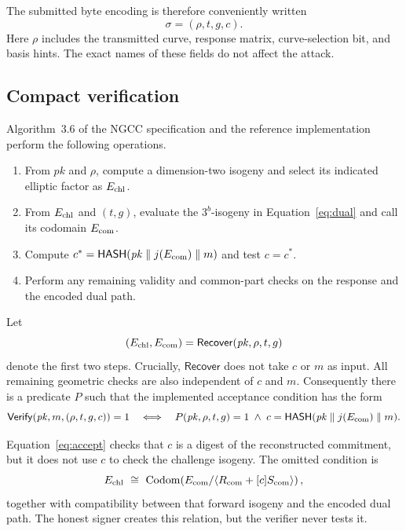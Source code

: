 \documentclass[11pt,a4paper]{article}
\newcommand{\Hash}{\mathsf{HASH}}
\newcommand{\Rec}{\mathsf{Recover}}
\newcommand{\Verify}{\mathsf{Verify}}
\newcommand{\Codom}{\operatorname{Codom}}
\begin{document}
The submitted byte encoding is therefore conveniently written
\begin{equation}
  \sigma=(\rho,t,g,c).                                                \label{eq:sig}
\end{equation}
Here $\rho$ includes the transmitted curve, response matrix, curve-selection bit, and basis
hints.  The exact names of these fields do not affect the attack.

\subsection{Compact verification}

Algorithm~3.6 of the NGCC specification and the reference implementation perform the following operations.
\begin{enumerate}[leftmargin=1.7em]
  \item From $\mathit{pk}$ and $\rho$, compute a dimension-two isogeny and select its indicated
        elliptic factor as $E_{\rm chl}$.
  \item From $E_{\rm chl}$ and $(t,g)$, evaluate the $3^b$-isogeny in
        Equation~\eqref{eq:dual} and call its codomain $E_{\rm com}$.
  \item Compute $c^*=\Hash(\mathit{pk}\parallel j(E_{\rm com})\parallel m)$ and test
        $c=c^*$.
  \item Perform any remaining validity and common-part checks on the response and the encoded
        dual path.
\end{enumerate}

Let
\begin{equation}
  (E_{\rm chl},E_{\rm com})=\Rec(\mathit{pk},\rho,t,g)                \label{eq:recover}
\end{equation}
denote the first two steps.  Crucially, $\Rec$ does not take $c$ or $m$ as input.  All remaining
geometric checks are also independent of $c$ and $m$.  Consequently there is a predicate
$P$ such that the implemented acceptance condition has the form
\begin{equation}
  \Verify(\mathit{pk},m,(\rho,t,g,c))=1
  \quad\Longleftrightarrow\quad
  P(\mathit{pk},\rho,t,g)=1
  \;\wedge\;
  c=\Hash(\mathit{pk}\parallel j(E_{\rm com})\parallel m).           \label{eq:accept}
\end{equation}

Equation~\eqref{eq:accept} checks that $c$ is a digest of the reconstructed commitment, but
it does not use $c$ to check the challenge isogeny.  The omitted condition is
\begin{equation}
  E_{\rm chl}\ \cong\
  \Codom\!\left(E_{\rm com}/
  \langle R_{\rm com}+[c]S_{\rm com}\rangle\right),                  \label{eq:missing}
\end{equation}
together with compatibility between that forward isogeny and the encoded dual path.  The
honest signer creates this relation, but the verifier never tests it.
\end{document}
